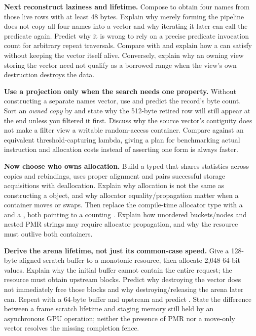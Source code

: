 \textbf{Next reconstruct laziness and lifetime.} Compose  to obtain four names from those live rows with at least 48 bytes. Explain why merely forming the pipeline does not copy all four names into a vector and why iterating it later can call the predicate again. Predict why it is wrong to rely on a precise predicate invocation count for arbitrary repeat traversals. Compare  with  and explain how a  can satisfy  without keeping the vector itself alive. Conversely, explain why an owning view storing the vector need not qualify as a borrowed range when the view's own destruction destroys the data.

\textbf{Use a projection only when the search needs one property.} Without constructing a separate names vector, use  and predict the record's byte count. Sort an \emph{owned copy} by  and state why the 512-byte retired row will still appear at the end unless you filtered it first. Discuss why the source vector's contiguity does not make a filter view a writable random-access container. Compare  against an equivalent threshold-capturing lambda, giving a plan for benchmarking actual instruction and allocation costs instead of asserting one form is always faster.

\textbf{Now choose who owns allocation.} Build a typed  that shares statistics across copies and rebindings, uses proper alignment and pairs successful storage acquisitions with deallocation. Explain why allocation is not the same as constructing a  object, and why allocator equality/propagation matter when a container moves or swaps. Then replace the compile-time allocator type with a  and a , both pointing to a counting . Explain how unordered buckets/nodes and nested PMR strings may require allocator propagation, and why the resource must outlive both containers.

\textbf{Derive the arena lifetime, not just its common-case speed.} Give a 128-byte aligned scratch buffer to a monotonic resource, then allocate 2,048 64-bit values. Explain why the initial buffer cannot contain the entire request; the resource must obtain upstream blocks. Predict why destroying the vector does not immediately free those blocks and why destroying/releasing the arena later can. Repeat with a 64-byte buffer and  upstream and predict . State the difference between a frame scratch lifetime and staging memory still held by an asynchronous GPU operation; neither the presence of PMR nor a move-only vector resolves the missing completion fence.

